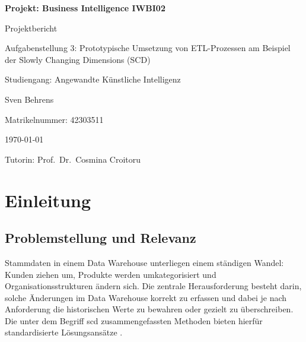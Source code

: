 \documentclass[a4paper,11pt]{article}
\begin{document}
\begin{titlepage}
    \thispagestyle{empty}
    \centering
    \vspace*{5cm}
    {\Huge\bfseries Projekt: Business Intelligence IWBI02 \par}
    \vspace{1cm}
    {\Large Projektbericht \par}
    \vspace{0.3cm}
    {\large Aufgabenstellung 3: Prototypische Umsetzung von ETL-Prozessen am Beispiel der Slowly Changing Dimensions (SCD) \par}
    \vspace{0.5cm}
    {\large Studiengang: Angewandte Künstliche Intelligenz \par}
    \vspace{0.5cm}
    {\large Sven Behrens \par}
    \vspace{0.5cm}
    {\large Matrikelnummer: 42303511 \par}
    \vspace{0.5cm}
    {\large \today \par}
    \vspace{0.5cm}
    {\large Tutorin: Prof.~Dr.~Cosmina Croitoru \par}
\end{titlepage}

\setcounter{page}{1}

\tableofcontents
\newpage

\listoffigures
{}
\newpage

\listoftables
{}
\newpage

\printglossary[type=\acronymtype,title=Abkürzungsverzeichnis]
\newpage

\setcounter{page}{1}

\section{Einleitung}

\subsection{Problemstellung und Relevanz}
Stammdaten in einem Data Warehouse unterliegen einem ständigen Wandel: Kunden ziehen um, 
Produkte werden umkategorisiert und Organisationsstrukturen ändern sich. Die zentrale Herausforderung 
besteht darin, solche Änderungen im Data Warehouse korrekt zu erfassen und dabei je nach Anforderung die 
historischen Werte zu bewahren oder gezielt zu überschreiben. Die unter dem Begriff \gls{scd} 
zusammengefassten Methoden bieten hierfür standardisierte Lösungsansätze \parencite[S.~181]{linstedt2015data}.
\end{document}
